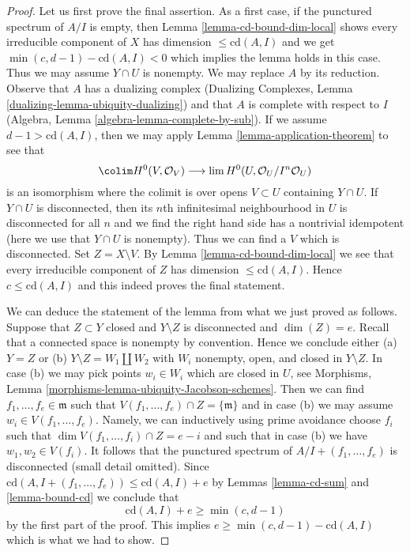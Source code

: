 \begin{proof}
Let us first prove the final assertion. As a first case, if the punctured
spectrum of $A/I$ is empty, then Lemma \ref{lemma-cd-bound-dim-local}
shows every irreducible component of $X$ has dimension
$\leq \text{cd}(A, I)$ and we get $\min(c, d - 1) - \text{cd}(A, I) < 0$
which implies the lemma holds in this case. Thus we may assume
$Y \cap U$ is nonempty. We may replace $A$ by its reduction.
Observe that $A$ has a dualizing complex
(Dualizing Complexes, Lemma \ref{dualizing-lemma-ubiquity-dualizing})
and that $A$ is complete with respect to $I$
(Algebra, Lemma \ref{algebra-lemma-complete-by-sub}).
If we assume $d - 1 > \text{cd}(A, I)$, then we may apply
Lemma \ref{lemma-application-theorem} to see that
$$
\colim H^0(V, \mathcal{O}_V)
\longrightarrow
\lim H^0(U, \mathcal{O}_U/I^n\mathcal{O}_U)
$$
is an isomorphism where the colimit is over opens $V \subset U$
containing $Y \cap U$. If $Y \cap U$ is disconnected, then
its $n$th infinitesimal neighbourhood in $U$ is disconnected
for all $n$ and we find the
right hand side has a nontrivial idempotent (here we use
that $Y \cap U$ is nonempty).
Thus we can find a $V$ which is disconnected.
Set $Z = X \setminus V$. By Lemma \ref{lemma-cd-bound-dim-local}
we see that every irreducible component of $Z$ has dimension
$\leq \text{cd}(A, I)$. Hence $c \leq \text{cd}(A, I)$ and this
indeed proves the final statement.

\medskip\noindent
We can deduce the statement of the lemma from what we just proved
as follows. Suppose that $Z \subset Y$ closed and $Y \setminus Z$ is
disconnected and $\dim(Z) = e$. Recall that a connected space is nonempty
by convention. Hence we conclude either (a) $Y = Z$ or (b)
$Y \setminus Z = W_1 \amalg W_2$ with $W_i$ nonempty, open, and closed
in $Y \setminus Z$. In case (b) we may pick points $w_i \in W_i$
which are closed in $U$, see
Morphisms, Lemma \ref{morphisms-lemma-ubiquity-Jacobson-schemes}.
Then we can find $f_1, \ldots, f_e \in \mathfrak m$
such that $V(f_1, \ldots, f_e) \cap Z = \{\mathfrak m\}$
and in case (b) we may assume $w_i \in V(f_1, \ldots, f_e)$.
Namely, we can inductively using prime avoidance
choose $f_i$ such that $\dim V(f_1, \ldots, f_i) \cap Z = e - i$
and such that in case (b) we have $w_1, w_2 \in V(f_i)$.
It follows that the punctured spectrum of $A/I + (f_1, \ldots, f_e)$
is disconnected (small detail omitted). Since
$\text{cd}(A, I + (f_1, \ldots, f_e)) \leq \text{cd}(A, I) + e$
by Lemmas \ref{lemma-cd-sum} and \ref{lemma-bound-cd} we conclude that
$$
\text{cd}(A, I) + e \geq \min(c, d - 1)
$$
by the first part of the proof. This implies
$e \geq \min(c, d - 1) - \text{cd}(A, I)$ which is what we had to show.
\end{proof}




